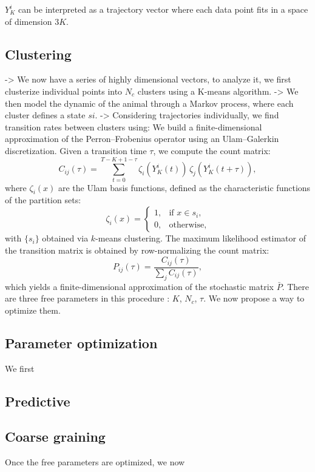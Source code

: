$Y_K^i$ can be interpreted as a trajectory vector where each data point fits in a space of dimension $3K$.

\subsection{Clustering}

-> We now have a series of highly dimensional vectors, to analyze it, we first clusterize individual points into $N_c$ clusters using a K-means algorithm.
-> We then model the dynamic of the animal through a Markov process, where each cluster defines a state $si$. 
-> Considering trajectories individually, we find transition rates between clusters using:
We build a finite-dimensional approximation of the Perron–Frobenius operator using an Ulam–Galerkin discretization. Given a transition time \( \tau \), we compute the count matrix:
\[
C_{ij}(\tau) = \sum_{t=0}^{T-K+1 - \tau} \zeta_i(Y_{K}^i(t)) \, \zeta_j(Y_{K}^i(t + \tau)),
\]
where \( \zeta_i(x) \) are the Ulam basis functions, defined as the characteristic functions of the partition sets:
\[
\zeta_i(x) =
\begin{cases}
1, & \text{if } x \in s_i, \\
0, & \text{otherwise},
\end{cases}
\]
with \( \{s_i\} \) obtained via \( k \)-means clustering. The maximum likelihood estimator of the transition matrix is obtained by row-normalizing the count matrix:
\[
P_{ij}(\tau) = \frac{C_{ij}(\tau)}{\sum_j C_{ij}(\tau)},
\]
which yields a finite-dimensional approximation of the stochastic matrix $\bar{P}$. There are three free parameters in this procedure : $K$, $N_c$, $\tau$. We now propose a way to optimize them.

\subsection{Parameter optimization}

We first 



\subsection{Predictive }

\subsection{Coarse graining}

Once the free parameters are optimized, we now 







